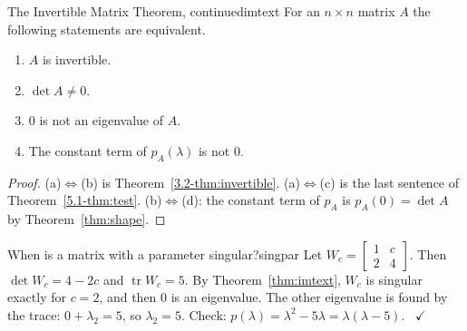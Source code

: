 \documentclass[11pt]{article}
\begin{document}
\begin{thm}{The Invertible Matrix Theorem, continued}{imtext}
For an $n\times n$ matrix $A$ the following statements are equivalent.
\begin{enumerate}[label=(\alph*),itemsep=1pt]
  \item $A$ is invertible.
  \item $\det A\neq0$.
  \item $0$ is not an eigenvalue of $A$.
  \item The constant term of $p_A(\lambda)$ is not $0$.
\end{enumerate}
\end{thm}

\begin{proof}
(a)$\iff$(b) is Theorem~\ref{3.2-thm:invertible}. (a)$\iff$(c) is the last sentence of Theorem~\ref{5.1-thm:test}. (b)$\iff$(d): the constant term of $p_A$ is $p_A(0)=\det A$ by Theorem~\ref{thm:shape}.
\end{proof}

\begin{exmp}{When is a matrix with a parameter singular?}{singpar}
Let $W_c=\begin{bmatrix}1&c\\2&4\end{bmatrix}$. Then $\det W_c=4-2c$ and $\operatorname{tr}W_c=5$. By Theorem~\ref{thm:imtext}, $W_c$ is singular exactly for $c=2$, and then $0$ is an eigenvalue. The other eigenvalue is found by the trace: $0+\lambda_2=5$, so $\lambda_2=5$. Check: $p(\lambda)=\lambda^2-5\lambda=\lambda(\lambda-5)$. \ $\checkmark$
\end{exmp}
\end{document}
